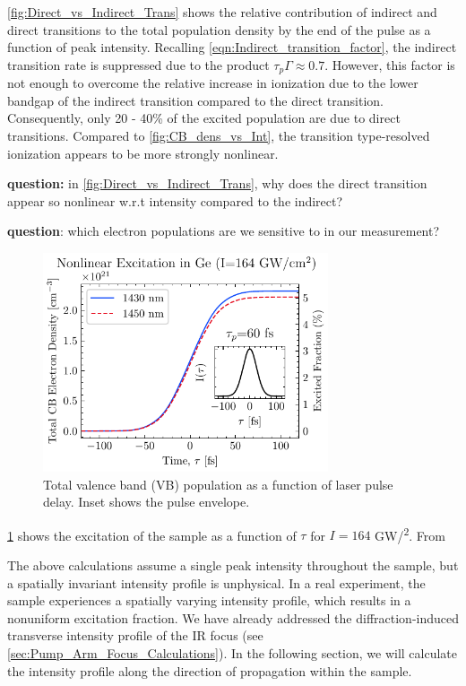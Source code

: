 \cref{fig:Direct_vs_Indirect_Trans} shows the relative contribution of indirect and direct transitions to the total population density by the end of the pulse as a function of peak intensity. Recalling \cref{eqn:Indirect_transition_factor}, the indirect transition rate is suppressed due to the product $\tau_p \Gamma \approx 0.7$. However, this factor is not enough to overcome the relative increase in ionization due to the lower bandgap of the indirect transition compared to the direct transition. Consequently, only {20 - 40\%} of the excited population are due to direct transitions. Compared to \cref{fig:CB_dens_vs_Int}, the transition type-resolved ionization appears to be more strongly nonlinear.

\textbf{question:} in \cref{fig:Direct_vs_Indirect_Trans}, why does the direct transition appear so nonlinear w.r.t intensity compared to the indirect?

\textbf{question}: which electron populations are we sensitive to in our measurement?

\begin{figure}
	\centering
	\includegraphics[width=0.75\textwidth]{figures/chap4/Total_CB_dens_vs_Time.pdf}
	\caption{Total valence band (VB) population as a function of laser pulse delay. Inset shows the pulse envelope.}
	\label{fig:Total_CB_dens_vs_Time}
\end{figure}

\cref{fig:Total_CB_dens_vs_Time} shows the excitation of the sample as a function of $\tau$ for $I = 164$ GW/\textsuperscript{2}. From 

The above calculations assume a single peak intensity throughout the sample, but a spatially invariant intensity profile is unphysical. In a real experiment, the sample experiences a spatially varying intensity profile, which results in a nonuniform excitation fraction. We have already addressed the diffraction-induced transverse intensity profile of the IR focus (see \cref{sec:Pump_Arm_Focus_Calculations}). In the following section, we will calculate the intensity profile along the direction of propagation within the sample.

